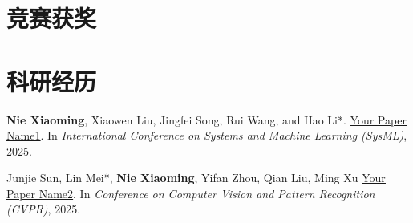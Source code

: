 \documentclass{resume}
\begin{document}
\section{\faMedal \kaishu 竞赛获奖}


\section{\faFilesO \kaishu 科研经历}
\begin{enumerate}[label={[\arabic*]}, leftmargin=*, itemsep=0pt, parsep=0pt]
  \item
  \textbf{Nie Xiaoming}, Xiaowen Liu, Jingfei Song, Rui Wang, and Hao Li*.
  \href{https://example.com}{\ul{Your Paper Name1}}.
  In \textit{International Conference on Systems and Machine Learning (SysML)}, 2025.

  \item
  Junjie Sun, Lin Mei*, \textbf{Nie Xiaoming}, Yifan Zhou, Qian Liu, Ming Xu
  \href{https://example.com}{\ul{Your Paper Name2}}.
  In \textit{Conference on Computer Vision and Pattern Recognition (CVPR)}, 2025.
\end{enumerate}

%
%
\end{document}
